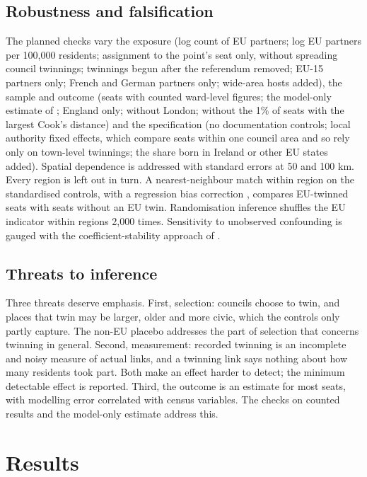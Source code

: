 \documentclass[11pt,a4paper]{article}
\begin{document}
\subsection{Robustness and falsification}
The planned checks vary the exposure (log count of EU partners; log EU partners per 100,000 residents; assignment to the point's seat only, without spreading council twinnings; twinnings begun after the referendum removed; EU-15 partners only; French and German partners only; wide-area hosts added), the sample and outcome (seats with counted ward-level figures; the model-only estimate of \citealt{hanretty2017}; England only; without London; without the 1\% of seats with the largest Cook's distance) and the specification (no documentation controls; local authority fixed effects, which compare seats within one council area and so rely only on town-level twinnings; the share born in Ireland or other EU states added). Spatial dependence is addressed with \citet{conley1999} standard errors at 50 and 100 km. Every region is left out in turn. A nearest-neighbour match within region on the standardised controls, with a regression bias correction \citep{abadie2006}, compares EU-twinned seats with seats without an EU twin. Randomisation inference shuffles the EU indicator within regions 2,000 times. Sensitivity to unobserved confounding is gauged with the coefficient-stability approach of \citet{oster2019}.

\subsection{Threats to inference}
Three threats deserve emphasis. First, selection: councils choose to twin, and places that twin may be larger, older and more civic, which the controls only partly capture. The non-EU placebo addresses the part of selection that concerns twinning in general. Second, measurement: recorded twinning is an incomplete and noisy measure of actual links, and a twinning link says nothing about how many residents took part. Both make an effect harder to detect; the minimum detectable effect is reported. Third, the outcome is an estimate for most seats, with modelling error correlated with census variables. The checks on counted results and the model-only estimate address this.

\section{Results}\label{sec:results}
\end{document}

